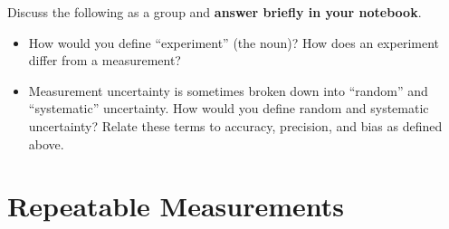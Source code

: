 \documentclass[11pt]{article}%
\begin{document}
%

Discuss the following as a group and \textbf{answer briefly in your notebook}.

\begin{itemize}
\item How would you define ``experiment'' (the noun)? How does an
experiment differ from a measurement?
\vspace{3em}
\item Measurement uncertainty is sometimes broken down into ``random'' and ``systematic'' uncertainty. How would you define random and systematic uncertainty? Relate these terms to accuracy, precision, and bias as defined above.
\vspace{3em}
\end{itemize}

\section{Repeatable Measurements}
\end{document}
